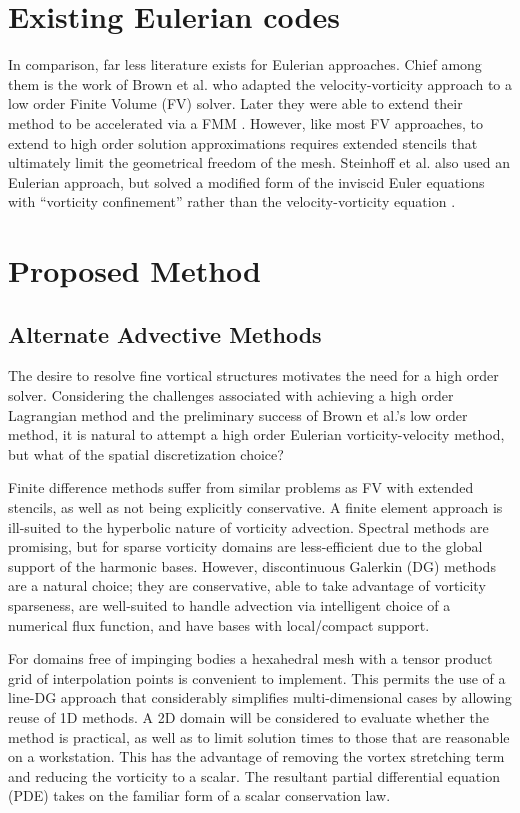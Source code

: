 \documentclass[letterpaper,12pt]{report}
\begin{document}
\section{Existing Eulerian codes}
In comparison, far less literature exists for Eulerian approaches. Chief among them is the work of Brown et al. \cite{Brown2000} who adapted the velocity-vorticity approach to a low order Finite Volume (FV) solver. Later they were able to extend their method to be accelerated via a FMM \cite{Brown2004}. However, like most FV approaches, to extend to high order solution approximations requires extended stencils that ultimately limit the geometrical freedom of the mesh. Steinhoff et al. also used an Eulerian approach, but solved a modified form of the inviscid Euler equations with ``vorticity confinement'' rather than the velocity-vorticity equation \cite{SteinhoffUnderhill1994}.
%
\section{Proposed Method}
\subsection{Alternate Advective Methods}
The desire to resolve fine vortical structures motivates the need for a high order solver. Considering the challenges associated with achieving a high order Lagrangian method and the preliminary success of Brown et al.'s low order method, it is natural to attempt a high order Eulerian vorticity-velocity method, but what of the spatial discretization choice?

Finite difference methods suffer from similar problems as FV with extended stencils, as well as not being explicitly conservative. A finite element approach is ill-suited to the hyperbolic nature of vorticity advection. Spectral methods are promising, but for sparse vorticity domains are less-efficient due to the global support of the harmonic bases. However, discontinuous Galerkin (DG) methods \cite{HestWar} are a natural choice; they are conservative, able to take advantage of vorticity sparseness, are well-suited to handle advection via intelligent choice of a numerical flux function, and have bases with local/compact support.

For domains free of impinging bodies a hexahedral mesh with a tensor product grid of interpolation points is convenient to implement. This permits the use of a line-DG \cite{Persson2013} approach that considerably simplifies multi-dimensional cases by allowing reuse of 1D methods. A 2D domain will be considered to evaluate whether the method is practical, as well as to limit solution times to those that are reasonable on a workstation. This has the advantage of removing the vortex stretching term and reducing the vorticity to a scalar. The resultant partial differential equation (PDE) takes on the familiar form of a scalar conservation law.
\end{document}
